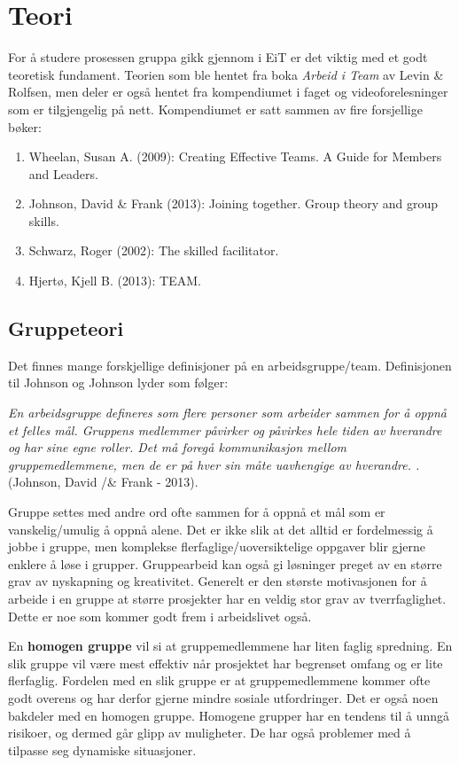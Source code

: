 \section{Teori}
For å studere prosessen gruppa gikk gjennom i EiT er det viktig med et godt teoretisk fundament. 
Teorien som ble hentet fra boka \textit{Arbeid i Team} av Levin \& Rolfsen, men deler er også hentet fra kompendiumet i faget og videoforelesninger som er tilgjengelig på nett. 
Kompendiumet er satt sammen av fire forsjellige bøker:
\begin{enumerate}
    \item Wheelan, Susan A. (2009): Creating Effective Teams. A Guide for Members and Leaders.
    \item Johnson, David \& Frank (2013): Joining together. Group theory and group skills.
    \item Schwarz, Roger (2002): The skilled facilitator. 
    \item Hjertø, Kjell B. (2013): TEAM.
\end{enumerate}

\subsection{Gruppeteori}
Det finnes mange forskjellige definisjoner på en arbeidsgruppe/team. 
Definisjonen til Johnson og Johnson lyder som følger:

\begin{center}
\textit{En arbeidsgruppe defineres som flere personer som arbeider sammen for å oppnå et felles mål. 
Gruppens medlemmer påvirker og påvirkes hele tiden av hverandre og har sine egne roller. 
Det må foregå kommunikasjon mellom gruppemedlemmene, men de er på hver sin måte uavhengige av hverandre. .} 
(Johnson, David /& Frank - 2013).
\end{center}

Gruppe settes med andre ord ofte sammen for å oppnå et mål som er vanskelig/umulig å oppnå alene. 
Det er ikke slik at det alltid er fordelmessig å jobbe i gruppe, men komplekse flerfaglige/uoversiktelige oppgaver blir gjerne enklere å løse i grupper.
Gruppearbeid kan også gi løsninger preget av en større grav av nyskapning og kreativitet. 
Generelt er den største motivasjonen for å arbeide i en gruppe at større prosjekter har en veldig stor grav av tverrfaglighet. 
Dette er noe som kommer godt frem i arbeidslivet også. 

En \textbf{homogen gruppe} vil si at gruppemedlemmene har liten faglig spredning. 
En slik gruppe vil være mest effektiv når prosjektet har begrenset omfang og er lite flerfaglig. 
Fordelen med en slik gruppe er at gruppemedlemmene kommer ofte godt overens og har derfor gjerne mindre sosiale utfordringer. 
Det er også noen bakdeler med en homogen gruppe. 
Homogene grupper har en tendens til å unngå risikoer, og dermed går glipp av muligheter. 
De har også problemer med å tilpasse seg dynamiske situasjoner.

